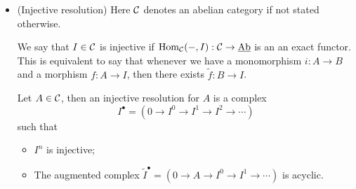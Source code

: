 \begin{itemize}
    \item(Injective resolution)
    Here $\mathcal{C}$ denotes an abelian category if not stated otherwise.
    \begin{definition}
        We say that $I\in\mathcal{C}$ is injective if 
        $\text{Hom}_{\mathcal{C}}(-,I):\mathcal{C}\to \underline{\text{Ab}}$ is an an exact functor. This is equivalent to say that 
        whenever we have a monomorphism $i: A\to B$ and a morphism $f:A\to I$, then there exists 
        $\widetilde{f}: B\to I$.
        \begin{center}
        \end{center}
    \end{definition}
    \begin{definition}
        Let $A\in\mathcal{C}$, then an injective resolution for $A$ is a complex 
        \begin{equation}
          I^\bullet = (0\to I^0\to I^1\to I^2\to\cdots)
        \end{equation}
        such that 
        \begin{itemize}
            \item[(1)] $I^n$ is injective;
            \item[(2)] The augmented complex 
            $\widetilde{I}^\bullet=(0\to A\to I^0\to I^1\to\cdots)$ is acyclic.
        \end{itemize}
     \end{definition}


\end{itemize}

